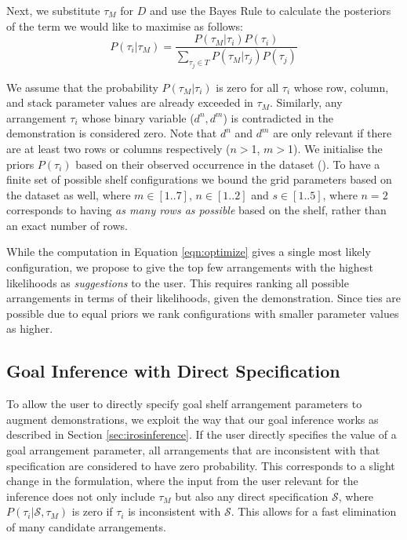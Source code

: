 Next, we substitute $\tau_M$ for $D$ and use the Bayes Rule to calculate the posteriors of the term we would like to maximise as follows:
$$P(\tau_i|\tau_M) = \frac{P(\tau_M|\tau_i)P(\tau_i)}{\underset{\tau_j \in T}{\sum} P(\tau_M|\tau_j)P(\tau_j)}$$

We assume that the probability $P(\tau_M | \tau_i)$ is zero for all $\tau_i$ whose row, column, and stack parameter values are already exceeded in $\tau_M$.
Similarly, any arrangement $\tau_i$ whose binary variable ($d^n, d^m$) is contradicted in the demonstration is considered zero.
Note that $d^n$ and $d^m$ are only relevant if there are at least two rows or columns respectively ($n$$>$1, $m$$>$1).
We initialise the priors $P(\tau_i)$ based on their observed occurrence in the dataset ().
To have a finite set of possible shelf configurations we bound the grid parameters based on the dataset as well, where $m \in [1..7]$, $n \in [1..2]$ and $s \in [1..5]$, where $n=2$ corresponds to having \textit{as many rows as possible} based on the shelf, rather than an exact number of rows.


While the computation in Equation \ref{eqn:optimize} gives a single most likely configuration, we propose to give the top few arrangements with the highest likelihoods as {\em suggestions} to the user.
This requires ranking all possible arrangements in terms of their likelihoods, given the demonstration.
Since ties are possible due to equal priors we rank configurations with smaller parameter values as higher.

\subsection{Goal Inference with Direct Specification}
\label{sec:irosspecification}

To allow the user to directly specify goal shelf arrangement parameters to augment demonstrations, we exploit the way that our goal inference works as described in Section \ref{sec:irosinference}.
If the user directly specifies the value of a goal arrangement parameter, all arrangements that are inconsistent with that specification are considered to have zero probability. 
This corresponds to a slight change in the formulation, where the input from the user relevant for the inference does not only include $\tau_M$ but also any direct specification $\mathcal{S}$, where $P(\tau_i | \mathcal{S}, \tau_M)$ is zero if $\tau_i$ is inconsistent with $\mathcal{S}$.
This allows for a fast elimination of many candidate arrangements.


